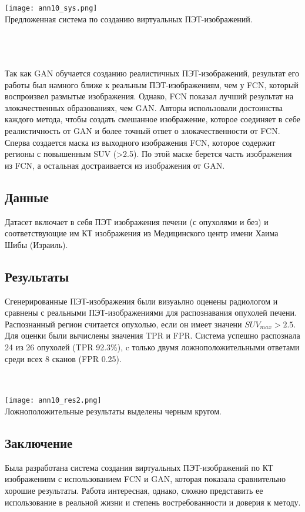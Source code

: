 \begin{minipage}{1.0\linewidth}
    \begin{center}
        \texttt{[image: ann10\_sys.png]} \\
        \caption{\scriptsize{Предложенная система по созданию виртуальных ПЭТ-изображений.}}
    \end{center}
    
\end{minipage}
\\
\\
\\
Так как GAN обучается созданию реалистичных ПЭТ-изображений, результат его 
работы был намного ближе к реальным ПЭТ-изображениям, чем у FCN, который воспроизвел 
размытые изображения. Однако, FCN показал лучший результат на злокачественных
образованиях, чем GAN. Авторы использовали достоинства каждого метода, чтобы создать 
смешанное изображение, которое соединяет в себе реалистичность от GAN и более точный ответ 
о злокачественности от FCN. Сперва создается маска из выходного изображения FCN, которое 
содержит регионы с повышенным SUV (>2.5). По этой маске берется часть изображения из FCN, а 
остальная достраивается из изображения от GAN.

\subsection*{Данные}
Датасет включает в себя ПЭТ изображения печени (с опухолями и без) и соответствующие им
КТ изображения из Медицинского центр имени Хаима Шибы  (Израиль).
\subsection*{Результаты}
Сгенерированные ПЭТ-изображения были визуаьлно оценены радиологом и сравнены с реальными ПЭТ-изображениями
для распознавания опухолей печени. Распознанный регион считается опухолью, если он имеет 
значени \(SUV_{max}>2.5\).  Для оценки были вычислены значения TPR и FPR.
Система успешно распознала 24 из 26 опухолей (TPR 92.3\%), c только 
двумя ложноположительными ответами среди всех 8 сканов (FPR 0.25).
\\
\\
\\
\begin{minipage}{1.0\linewidth}
    \begin{center}
        \texttt{[image: ann10\_res2.png]} \\
        \caption{\scriptsize{Ложноположительные результаты выделены черным кругом.}}
    \end{center}
    
\end{minipage}
\subsection*{Заключение}
Была разработана система создания виртуальных ПЭТ-изображений 
по КТ изображениям с использованием FCN и GAN, которая показала 
сравнительно хорошие результаты. Работа интересная, однако, сложно представить 
ее использование в реальной жизни и степень востребованности и доверия к методу.